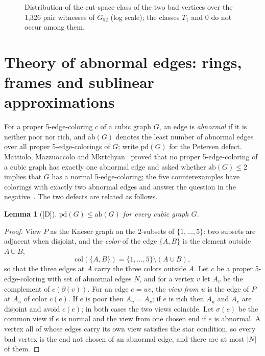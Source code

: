 \documentclass[11pt]{article}
\newtheorem{lemma}[theorem]{Lemma}
\theoremstyle{definition}
\theoremstyle{remark}
\newcommand{\PG}{P}
\newcommand{\Gfty}{G_{52}}
\newcommand{\pd}{\mathrm{pd}}
\newcommand{\ab}{\mathrm{ab}}
\newcommand{\dd}{\textup{[D]}}
\begin{document}
\begin{figure}[htbp]\centering

\caption{Distribution of the cut-space class of the two bad vertices over the 1{,}326 pair witnesses
of $\Gfty$ (log scale); the classes $T_1$ and $0$ do not occur among them.}\label{fig:classes}
\end{figure}

\section{Theory of abnormal edges: rings, frames and sublinear approximations}\label{sec:abnormal}

For a proper 5-edge-coloring $c$ of a cubic graph $G$, an edge is \emph{abnormal} if it is neither
poor nor rich, and $\ab(G)$ denotes the least number of abnormal edges over all proper
5-edge-colorings of $G$; write $\pd(G)$ for the Petersen defect. Mattiolo, Mazzuoccolo and
Mkrtchyan~\cite{MMM2021} proved that no proper 5-edge-coloring of a cubic graph has exactly one
abnormal edge and asked whether $\ab(G) \le 2$ implies that $G$ has a normal 5-edge-coloring; the
five counterexamples have colorings with exactly two abnormal edges and answer the question in the
negative~\cite{GJMMMU2026}. The two defects are related as follows.

\begin{lemma}[\dd]\label{lem:pdab}
$\pd(G) \le \ab(G)$ for every cubic graph $G$.
\end{lemma}

\begin{proof}
View $\PG$ as the Kneser graph on the 2-subsets of $\{1,\dots,5\}$: two subsets are adjacent when
disjoint, and the \emph{color} of the edge $\{A, B\}$ is the element outside $A \cup B$,
\begin{equation}\label{eq:kneser}
\mathrm{col}(\{A,B\}) = \{1,\dots,5\} \setminus (A \cup B),
\end{equation}
so that the three edges at $A$ carry the three colors outside $A$. Let $c$ be a proper 5-edge-coloring with
set of abnormal edges $N$, and for a vertex $v$ let $A_v$ be the complement of $c(\partial(v))$.
For an edge $e = uv$, the \emph{view from $u$} is the edge of $\PG$ at $A_u$ of color $c(e)$. If
$e$ is poor then $A_u = A_v$; if $e$ is rich then $A_u$ and $A_v$ are disjoint and avoid $c(e)$; in
both cases the two views coincide. Let $\sigma(e)$ be the common view if $e$ is normal and the view
from one chosen end if $e$ is abnormal. A vertex all of whose edges carry its own view satisfies
the star condition, so every bad vertex is the end not chosen of an abnormal edge, and there are
at most $|N|$ of them.
\end{proof}
\end{document}
